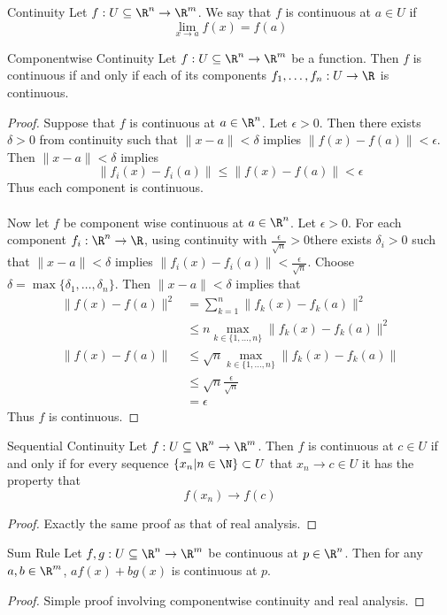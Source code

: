 \documentclass[a4paper]{article}
\begin{document}
\begin{defn}{Continuity}{} Let $f:U\subseteq\R^n\to\R^m$. We say that $f$ is continuous at $a\in U$ if $$\lim_{x \to a}f(x)=f(a)$$
\end{defn}

\begin{thm}{Componentwise Continuity}{} Let $f:U\subseteq\R^n\to\R^m$ be a function. Then $f$ is continuous if and only if each of its components $f_1,\dots,f_n:U\to\R$ is continuous. \tcbline
\begin{proof}
Suppose that $f$ is continuous at $a\in\R^n$. Let $\epsilon>0$. Then there exists $\delta>0$ from continuity such that $\|x-a\|<\delta$ implies $\|f(x)-f(a)\|<\epsilon$. Then $\|x-a\|<\delta$ implies $$\|f_i(x)-f_i(a)\|\leq\|f(x)-f(a)\|<\epsilon$$ Thus each component is continuous. \\~\\
Now let $f$ be component wise continuous at $a\in\R^n$. Let $\epsilon>0$. For each component $f_i:\R^n\to\R$, using continuity with $\frac{\epsilon}{\sqrt{n}}>0$there exists $\delta_i>0$ such that $\|x-a\|<\delta$ implies $\|f_i(x)-f_i(a)\|<\frac{\epsilon}{\sqrt{n}}$. Choose $\delta=\max\{\delta_1,\dots,\delta_n\}$. Then $\|x-a\|<\delta$ implies that 
\begin{align*}
\|f(x)-f(a)\|^2&=\sum_{k=1}^n\|f_k(x)-f_k(a)\|^2\\
&\leq n\max_{k\in\{1,\dots,n\}}\|f_k(x)-f_k(a)\|^2\\
\|f(x)-f(a)\|&\leq\sqrt{n}\max_{k\in\{1,\dots,n\}}\|f_k(x)-f_k(a)\|\\
&\leq\sqrt{n}\frac{\epsilon}{\sqrt{n}}\\
&=\epsilon
\end{align*}
Thus $f$ is continuous. 
\end{proof}
\end{thm}

\begin{thm}{Sequential Continuity}{} Let $f:U\subseteq\R^n\to\R^m$. Then $f$ is continuous at $c\in U$ if and only if for every sequence $\{x_n|n\in\N\}\subset U$ that $x_n\to c\in U$ it has the property that $$f(x_n)\to f(c)$$ \tcbline
\begin{proof}
Exactly the same proof as that of real analysis. 
\end{proof}
\end{thm}

\begin{prp}{Sum Rule}{} Let $f,g:U\subseteq\R^n\to\R^m$ be continuous at $p\in\R^n$. Then for any $a,b\in\R^m$, $af(x)+bg(x)$ is continuous at $p$. \tcbline
\begin{proof}
Simple proof involving componentwise continuity and real analysis. 
\end{proof}
\end{prp}
\end{document}
